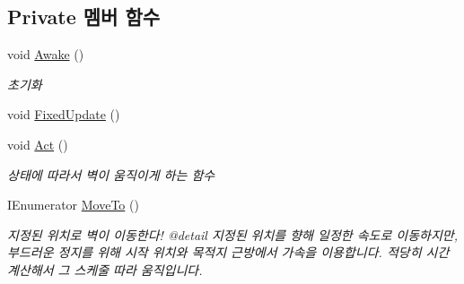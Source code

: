 \subsection*{Private 멤버 함수}
\begin{DoxyCompactItemize}
\item 
void \mbox{\hyperlink{class_moving_platform_aec6412bf79a5d4fdec57da2e3b390b93}{Awake}} ()
\begin{DoxyCompactList}\small\item\em 초기화 \end{DoxyCompactList}\item 
void \mbox{\hyperlink{class_moving_platform_a935710333a3a0f0164dad887e8eb7d1c}{Fixed\+Update}} ()
\item 
void \mbox{\hyperlink{class_moving_platform_ab4a3f15333f41ba4a3b9bc0227777460}{Act}} ()
\begin{DoxyCompactList}\small\item\em 상태에 따라서 벽이 움직이게 하는 함수 \end{DoxyCompactList}\item 
I\+Enumerator \mbox{\hyperlink{class_moving_platform_afb52616391e79cf7e015f5fb37d50e16}{Move\+To}} ()
\begin{DoxyCompactList}\small\item\em 지정된 위치로 벽이 이동한다! @detail 지정된 위치를 향해 일정한 속도로 이동하지만, 부드러운 정지를 위해 시작 위치와 목적지 근방에서 가속을 이용합니다. 적당히 시간 계산해서 그 스케줄 따라 움직입니다. \end{DoxyCompactList}\end{DoxyCompactItemize}
